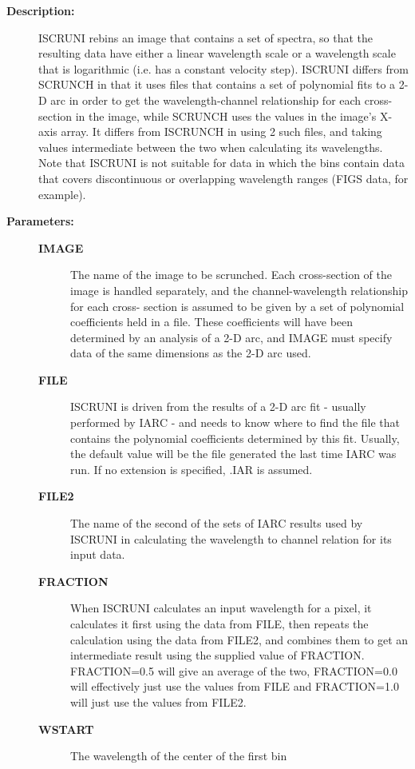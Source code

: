 \begin{description}
\begin{description}
\item [\textbf{Description:}]
 ISCRUNI rebins an image that contains a set of spectra, so that
 the resulting data have either a linear wavelength scale or a
 wavelength scale that is logarithmic (i.e. has a constant velocity
 step).  ISCRUNI differs from SCRUNCH in that it uses  files that
 contains a set of polynomial fits to a 2-D arc in order to get the
 wavelength-channel relationship for each cross-section in the
 image, while SCRUNCH uses the values in the image's X-axis array.
 It differs from ISCRUNCH in using 2 such files, and taking values
 intermediate between the two when calculating its wavelengths.
 Note that ISCRUNI is not suitable for data in which the bins
 contain data that covers discontinuous or overlapping wavelength
 ranges (FIGS data, for example).

\item [\textbf{Parameters:}]
\begin{description}
\item [\textbf{IMAGE}]
 The name of the image to be scrunched.  Each
 cross-section of the image is handled separately, and
 the channel-wavelength relationship for each cross-
 section is assumed to be given by a set of polynomial
 coefficients held in a file.  These coefficients will
 have been determined by an analysis of a 2-D arc, and
 IMAGE must specify data of the same dimensions as the
 2-D arc used.
\item [\textbf{FILE}]
 ISCRUNI is driven from the results of a 2-D arc fit -
 usually performed by IARC - and needs to know where to
 find the file that contains the polynomial coefficients
 determined by this fit.  Usually, the default value will
 be the file generated the last time IARC was run.  If no
 extension is specified, .IAR is assumed.
\item [\textbf{FILE2}]
 The name of the second of the sets of IARC
 results used by ISCRUNI in calculating the wavelength to
 channel relation for its input data.
\item [\textbf{FRACTION}]
 When ISCRUNI calculates an input wavelength for a pixel,
 it calculates it first using the data from FILE, then
 repeats the calculation using the data from FILE2, and
 combines them to get an intermediate result using the
 supplied value of FRACTION.  FRACTION=0.5 will give
 an average of the two, FRACTION=0.0 will effectively just
 use the values from FILE and FRACTION=1.0 will just use
 the values from FILE2.
\item [\textbf{WSTART}]
 The wavelength of the center of the first bin

\end{description}
\end{description}
\end{description}

